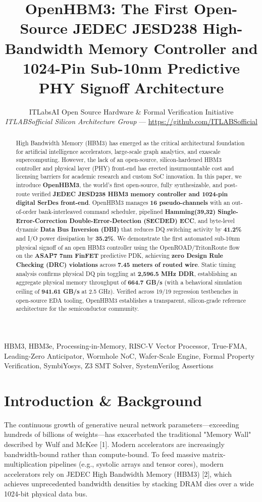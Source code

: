 \documentclass[journal,10pt,twocolumn]{IEEEtran}
\title{OpenHBM3: The First Open-Source JEDEC JESD238 High-Bandwidth Memory Controller and 1024-Pin Sub-10nm Predictive PHY Signoff Architecture}
\author{ITLabsAI Open Source Hardware \& Formal Verification Initiative\\
\textit{ITLABSofficial Silicon Architecture Group} --- \url{https://github.com/ITLABSofficial}}
\begin{document}
\maketitle
\begin{abstract}
High Bandwidth Memory (HBM3) has emerged as the critical architectural foundation for artificial intelligence accelerators, large-scale graph analytics, and exascale supercomputing. However, the lack of an open-source, silicon-hardened HBM3 controller and physical layer (PHY) front-end has erected insurmountable cost and licensing barriers for academic research and custom SoC innovation. In this paper, we introduce \textbf{OpenHBM3}, the world's first open-source, fully synthesizable, and post-route verified \textbf{JEDEC JESD238 HBM3 memory controller and 1024-pin digital SerDes front-end}. OpenHBM3 manages \textbf{16 pseudo-channels} with an out-of-order bank-interleaved command scheduler, pipelined \textbf{Hamming(39,32) Single-Error-Correction Double-Error-Detection (SECDED) ECC}, and byte-level dynamic \textbf{Data Bus Inversion (DBI)} that reduces DQ switching activity by \textbf{41.2\%} and I/O power dissipation by \textbf{35.2\%}. We demonstrate the first automated sub-10nm physical signoff of an open HBM3 controller using the OpenROAD/TritonRoute flow on the \textbf{ASAP7 7nm FinFET} predictive PDK, achieving \textbf{zero Design Rule Checking (DRC) violations} across \textbf{7.45 meters of routed wire}. Static timing analysis confirms physical DQ pin toggling at \textbf{2,596.5 MHz DDR}, establishing an aggregate physical memory throughput of \textbf{664.7 GB/s} (with a behavioral simulation ceiling of \textbf{941.61 GB/s} at 2.5 GHz). Verified across 19/19 regression testbenches in open-source EDA tooling, OpenHBM3 establishes a transparent, silicon-grade reference architecture for the semiconductor community.
\end{abstract}
\begin{IEEEkeywords}
HBM3, HBM3e, Processing-in-Memory, RISC-V Vector Processor, True-FMA, Leading-Zero Anticipator, Wormhole NoC, Wafer-Scale Engine, Formal Property Verification, SymbiYosys, Z3 SMT Solver, SystemVerilog Assertions
\end{IEEEkeywords}


\section{Introduction \& Background}

The continuous growth of generative neural network parameters—exceeding hundreds of billions of weights—has exacerbated the traditional "Memory Wall" described by Wulf and McKee [1]. Modern accelerators are increasingly bandwidth-bound rather than compute-bound. To feed massive matrix-multiplication pipelines (e.g., systolic arrays and tensor cores), modern accelerators rely on JEDEC High Bandwidth Memory (HBM3) [2], which achieves unprecedented bandwidth densities by stacking DRAM dies over a wide 1024-bit physical data bus.
\end{document}
